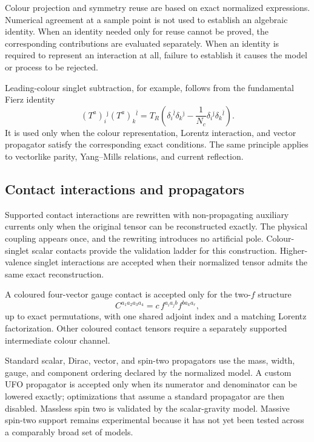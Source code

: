 Colour projection and symmetry reuse are based on exact normalized
expressions. Numerical agreement at a sample point is not used to establish an
algebraic identity. When an identity needed only for reuse cannot be proved,
the corresponding contributions are evaluated separately. When an identity
is required to represent an interaction at all, failure to establish it causes
the model or process to be rejected.

Leading-colour singlet subtraction, for example, follows from the fundamental
Fierz identity
\begin{equation}
  (T^a)_i{}^{\bar\jmath}(T^a)_k{}^{\bar l}
  =T_R\left(
    \delta_i{}^{\bar l}\delta_k{}^{\bar\jmath}
    -\frac{1}{N_c}
     \delta_i{}^{\bar\jmath}\delta_k{}^{\bar l}
  \right).
  \label{eq:fierz}
\end{equation}
It is used only when the colour representation, Lorentz interaction, and
vector propagator satisfy the corresponding exact conditions. The same
principle applies to vectorlike parity, Yang--Mills relations, and current
reflection.

\subsection{Contact interactions and propagators}

Supported contact interactions are rewritten with non-propagating auxiliary
currents only when the original tensor can be reconstructed exactly. The
physical coupling appears once, and the rewriting introduces no artificial
pole. Colour-singlet scalar contacts provide the validation ladder for this
construction. Higher-valence singlet interactions are accepted when their
normalized tensor admits the same exact reconstruction.

A coloured four-vector gauge contact is accepted only for the two-\(f\)
structure
\begin{equation}
  C^{a_1a_2a_3a_4}
  =c\,f^{a_i a_j b}f^{b a_k a_r},
  \label{eq:two-f-color}
\end{equation}
up to exact permutations, with one shared adjoint index and a matching Lorentz
factorization. Other coloured contact tensors require a separately supported
intermediate colour channel.

Standard scalar, Dirac, vector, and spin-two propagators use the mass, width,
gauge, and component ordering declared by the normalized model. A custom UFO
propagator is accepted only when its numerator and denominator can be lowered
exactly; optimizations that assume a standard propagator are then disabled.
Massless spin two is validated by the scalar-gravity model. Massive spin-two
support remains experimental because it has not yet been tested across a
comparably broad set of models.

